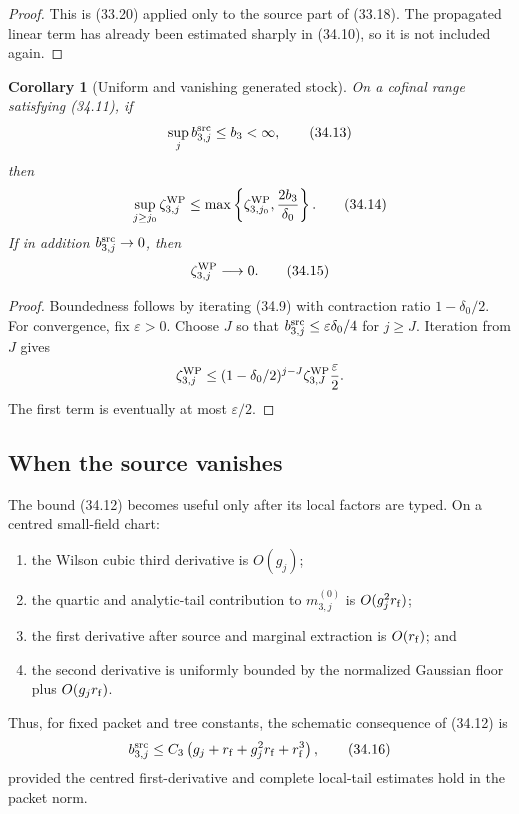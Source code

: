 \documentclass[11pt,oneside]{book}
\newtheorem{corollary}[theorem]{Corollary}
\theoremstyle{definition}
\theoremstyle{remark}
\begin{document}
\begin{proof}
This is (33.20) applied only to the source part of (33.18).  The
propagated linear term has already been estimated sharply in
(34.10), so it is not included again.
\end{proof}

\begin{corollary}[Uniform and vanishing generated stock]
\label{cor:e8v34-generated}
On a cofinal range satisfying (34.11), if
\[
                         \sup_jb_{3,j}^{\rm src}\leq b_3<\infty,
                                                                    \tag{34.13}
\]
then
\[
 \sup_{j\geq j_0}\zeta_{3,j}^{\rm WP}
 \leq
 \max\left\{
 \zeta_{3,j_0}^{\rm WP},\frac{2b_3}{\delta_0}
 \right\}.                                                       \tag{34.14}
\]
If in addition \(b_{3,j}^{\rm src}\to0\), then
\[
                         \zeta_{3,j}^{\rm WP}\longrightarrow0.   \tag{34.15}
\]
\end{corollary}

\begin{proof}
Boundedness follows by iterating (34.9) with contraction ratio
\(1-\delta_0/2\).  For convergence, fix \(\varepsilon>0\).  Choose
\(J\) so that \(b_{3,j}^{\rm src}\leq\varepsilon\delta_0/4\) for
\(j\geq J\).  Iteration from \(J\) gives
\[
 \zeta_{3,j}^{\rm WP}
 \leq
 (1-\delta_0/2)^{j-J}\zeta_{3,J}^{\rm WP}
 \frac{\varepsilon}{2}.
\]
The first term is eventually at most \(\varepsilon/2\).
\end{proof}

\subsection{When the source vanishes}

The bound (34.12) becomes useful only after its local factors are
typed.  On a centred small-field chart:
\begin{enumerate}
\item the Wilson cubic third derivative is \(O(g_j)\);
\item the quartic and analytic-tail contribution to
      \(m_{3,j}^{(0)}\) is \(O(g_j^2r_{\rm f})\);
\item the first derivative after source and marginal extraction is
      \(O(r_{\rm f})\); and
\item the second derivative is uniformly bounded by the normalized
      Gaussian floor plus \(O(g_jr_{\rm f})\).
\end{enumerate}
Thus, for fixed packet and tree constants, the schematic consequence
of (34.12) is
\[
 b_{3,j}^{\rm src}
 \leq
 C_3\left(g_j+r_{\rm f}+g_j^2r_{\rm f}+r_{\rm f}^3\right),        \tag{34.16}
\]
provided the centred first-derivative and complete local-tail
estimates hold in the packet norm.
\end{document}

